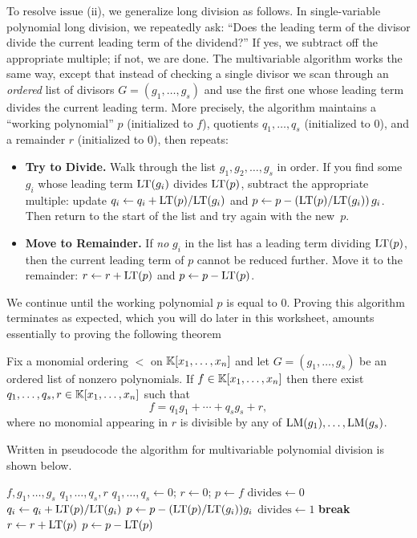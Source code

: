 \documentclass[Notebook.tex]{subfiles}
\begin{document}
To resolve issue (ii), we generalize long division as follows. In single-variable polynomial long division, we repeatedly ask: ``Does the leading term of the divisor divide the current leading term of the dividend?'' If yes, we subtract off the appropriate multiple; if not, we are done. The multivariable algorithm works the same way, except that instead of checking a single divisor we scan through an \emph{ordered} list of divisors $G=(g_1,\ldots,g_s)$ and use the first one whose leading term divides the current leading term. More precisely, the algorithm maintains a ``working polynomial'' $p$ (initialized to $f$), quotients $q_1,\ldots,q_s$ (initialized to $0$), and a remainder $r$ (initialized to $0$), then repeats:
\begin{itemize}
\item \textbf{Try to Divide.} Walk through the list $g_1,g_2,\ldots,g_s$ in order. If you find some $g_i$ whose leading term $\text{LT}(g_i)$ divides $\text{LT}(p)$, subtract the appropriate multiple: update $q_i\leftarrow q_i+\text{LT}(p)/\text{LT}(g_i)$ and $p\leftarrow p-(\text{LT}(p)/\text{LT}(g_i))\,g_i$. Then return to the start of the list and try again with the new~$p$.

\item \textbf{Move to Remainder.} If \emph{no} $g_i$ in the list has a leading term dividing $\text{LT}(p)$, then the current leading term of $p$ cannot be reduced further. Move it to the remainder: $r\leftarrow r+\text{LT}(p)$ and $p\leftarrow p-\text{LT}(p)$.
\end{itemize}
We continue until the working polynomial $p$ is equal to $0$. Proving this algorithm terminates as expected, which you will do later in this worksheet, amounts essentially to proving the following theorem

\begin{theorem}\label{thm:div-alg}
Fix a monomial ordering $<$ on $\mathbb K[x_1,\ldots,x_n]$ and let $G=(g_1,\ldots,g_s)$ be an ordered list of nonzero polynomials. If $f\in \mathbb K[x_1,\ldots,x_n]$ then there exist $q_1,\ldots,q_s,r\in \mathbb K[x_1,\ldots,x_n]$ such that
\[
f=q_1g_1+\cdots+q_sg_s+r,
\]
where no monomial appearing in $r$ is divisible by any of $\text{LM}(g_1),\ldots,\text{LM}(g_s)$. \end{theorem}

Written in pseudocode the algorithm for multivariable polynomial division is shown below.

\begin{algorithm}[H]
\caption{Division by an ordered list $G=(g_1,\ldots,g_s)$}
\begin{algorithmic}
\Require $f, g_1,\ldots,g_s$
\Ensure $q_1,\ldots,q_s,r$
\State $q_1,\ldots,q_s \gets 0$; $r\gets 0$; $p\gets f$
    \State $\mathrm{divides}\gets 0$
            \State $q_i\gets q_i+\text{LT}(p)/\text{LT}(g_i)$
            \State $p\gets p-(\text{LT}(p)/\text{LT}(g_i))g_i$
            \State $\mathrm{divides}\gets 1$
            \State \textbf{break}
        \EndIf
    \EndFor
        \State $r\gets r+\text{LT}(p)$
        \State $p\gets p-\text{LT}(p)$
    \EndIf
\EndWhile
\end{algorithmic}
\end{algorithm}
\end{document}
